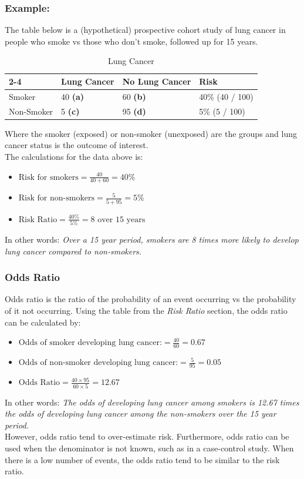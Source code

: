 \documentclass{article}
\begin{document}
\subsubsection*{Example:}
The table below is a (hypothetical) prospective cohort study of lung cancer in people who smoke vs those
who don't smoke, followed up for 15 years.
\begin{table}[H]
\centering
\begin{tabular}{l|l|l|l|}
\cline{2-4}
                                 & Lung Cancer     & No Lung Cancer  & Risk           \\ \hline
\multicolumn{1}{|l|}{Smoker}     & 40 \textbf{ (a)} & 60 \textbf{ (b)} & 40\% (40 / 100) \\ \hline
\multicolumn{1}{|l|}{Non-Smoker} & 5 \textbf{(c)}  & 95 \textbf{(d)} & 5\% (5 / 100)   \\ \hline
\end{tabular}
\label{tab:lung-cancer}
\caption{Lung Cancer}
\end{table}
Where the smoker (exposed) or non-smoker (unexposed) are the groups and lung cancer status is the outcome of interest.
\\
The calculations for the data above is:
\begin{itemize}
    \item $\text{Risk for smokers} = \frac{40}{40 + 60} = 40\% $
    \item $\text{Risk for non-smokers} = \frac{5}{5 + 95} = 5\% $
    \item $\text{Risk Ratio} = \frac{40\%}{5\%} = 8 \text{ over 15 years}$
\end{itemize}
In other words: \textit{Over a 15 year period, smokers are 8 times more likely to develop lung cancer
compared to non-smokers.}


\subsubsection{Odds Ratio}
Odds ratio is the ratio of the probability of an event occurring vs the probability of it not occurring.
Using the table from the \textit{Risk Ratio} section, the odds ratio can be calculated by:
\begin{itemize}
    \item $\text{Odds of smoker developing lung cancer:} = \frac{40}{60} = 0.67$
    \item $\text{Odds of non-smoker developing lung cancer:} = \frac{5}{95} = 0.05$
    \item $\text{Odds Ratio} = \frac{40 \times 95}{60 \times 5} = 12.67$
\end{itemize}
In other words: \textit{The odds of developing lung cancer among smokers is 12.67 times the odds of
developing lung cancer among the non-smokers over the 15 year period.}
\\
However, odds ratio tend to over-estimate risk. Furthermore, odds ratio can be used when the
denominator is not known, such as in a case-control study. When there is a low number of events,
the odds ratio tend to be similar to the risk ratio.
\end{document}
